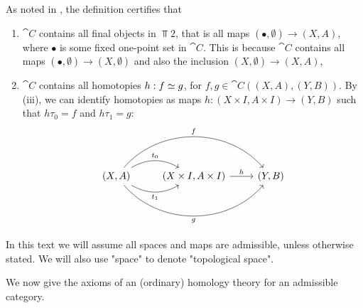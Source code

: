 \begin{remark}
As noted in \cite{Werndli}, the definition certifies that
\begin{enumerate}
    \item $\cat{C}$ contains all final objects in $\Top{2}$, that is all maps $(\bullet,\emptyset)\rightarrow (X,A)$, where $\bullet$ is some fixed one-point set in $\cat{C}$. This is because $\cat{C}$ contains all maps $(\bullet,\emptyset)\rightarrow (X,\emptyset)$ and also the inclusion $(X,\emptyset)\rightarrow (X,A)$,
    \item $\cat{C}$ contains all homotopies $h:f\simeq g$, for $f,g\in \cat{C}((X,A),(Y,B))$. By (iii), we can identify homotopies as maps $h:(X\times I,A\times I)\rightarrow (Y,B)$ such that $h\tau_0=f$ and $h\tau_1=g$:
\[\begin{tikzcd}
{(X,A)} \arrow[r, "t_1"', bend right] \arrow[r, "t_0", bend left] \arrow[rr, "f", bend left=49] \arrow[rr, "g"', bend right=49] & {(X\times I,A\times I)} \arrow[r, "h"] & {(Y,B)}
\end{tikzcd}\]
\end{enumerate}

\end{remark}

In this text we will assume all spaces and maps are admissible, unless otherwise stated. We will also use "space" to denote "topological space". 

We now give the axioms of an (ordinary) homology theory for an admissible category.

